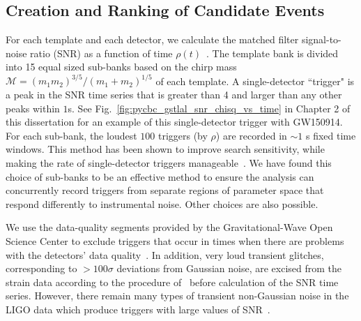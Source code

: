 \subsection{Creation and Ranking of Candidate Events}

For each template and each detector, we calculate the matched filter signal-to-noise ratio (SNR) as a function of time $\rho(t)$~\citep{Allen:2005fk}. The template bank is divided into 15 equal sized sub-banks based on the chirp mass $\mathcal{M} = (m_1m_2)^{3/5} / (m_1+m_2)^{1/5}$ of each template. A single-detector ``trigger" is a peak in the SNR time series that is greater than 4 and larger than any other peaks within $1$s. See Fig.~\ref{fig:pycbc_gstlal_snr_chisq_vs_time} in Chapter 2 of this dissertation for an example of this single-detector trigger with GW150914. For each sub-bank, the loudest $100$ triggers (by $\rho$) are recorded in $\sim1$ s fixed time windows. This method has been shown to improve search sensitivity, while making the rate of single-detector triggers manageable~\citep{Nitz:2018rgo}. We have found this choice of sub-banks to be an effective method to ensure the analysis can concurrently record triggers from separate regions of parameter space that respond differently to instrumental noise. Other choices are also possible.

 We use the data-quality segments provided by the Gravitational-Wave Open Science Center to exclude triggers that occur in times when there are problems with the detectors' data quality~\citep{TheLIGOScientific:2016zmo,TheLIGOScientific:2017lwt}.
 In addition, very loud transient glitches, corresponding to $>100\sigma$ deviations from Gaussian noise, are excised from the strain data according to the procedure of~\cite{Usman:2015kfa} before calculation of the SNR time series. However, there remain many types of transient non-Gaussian noise in the LIGO data which produce triggers with large values of SNR~\citep{Nuttall:2015dqa,TheLIGOScientific:2016zmo,TheLIGOScientific:2017lwt}. 

